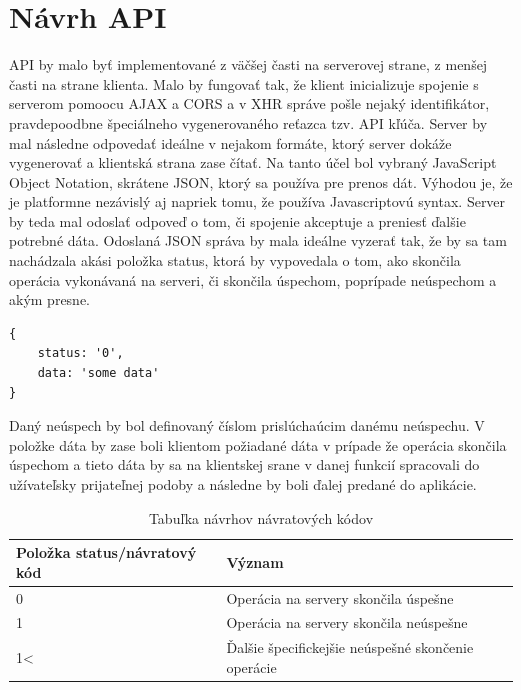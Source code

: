 \section{Návrh API}
API by malo byť implementované z väčšej časti na serverovej strane, z menšej časti na strane klienta. Malo by fungovať tak, že klient inicializuje spojenie s serverom pomoocu AJAX a CORS a v XHR správe pošle nejaký identifikátor, pravdepoodbne špeciálneho vygenerovaného reťazca tzv. API kľúča. Server by mal následne odpovedať ideálne v nejakom formáte, ktorý server dokáže vygenerovať a klientská strana zase čítať. Na tanto účel bol vybraný JavaScript Object Notation, skrátene JSON, ktorý sa používa pre prenos dát. Výhodou je, že je platformne nezávislý aj napriek tomu, že používa Javascriptovú syntax. Server by teda mal odoslať odpoveď o tom, či spojenie akceptuje a preniesť ďalšie potrebné dáta. Odoslaná JSON správa by mala ideálne vyzerať tak, že by sa tam nachádzala akási položka status, ktorá by vypovedala o tom, ako skončila operácia vykonávaná na serveri, či skončila úspechom, poprípade neúspechom a akým presne.  
\begin{lstlisting}[caption=JSON]
{
    status: '0',
    data: 'some data'
}
\end{lstlisting}
Daný neúspech by bol definovaný číslom prislúchaúcim danému neúspechu. V položke dáta by zase boli klientom požiadané dáta v prípade že operácia skončila úspechom a tieto dáta by sa na klientskej srane v danej funkcií spracovali do užívateľsky prijateľnej podoby a následne by boli ďalej predané do aplikácie.
\begin{table}[h]
\centering
\begin{tabular}{|l|l|l|}
\hline
Položka status/návratový kód & Význam \\ \hline
0 & Operácia na servery skončila úspešne \\ \hline
1 & Operácia na servery skončila neúspešne \\ \hline
1\textless & Ďalšie špecifickejšie neúspešné skončenie operácie \\ \hline
\end{tabular}
\label{navratovekody}
\caption{Tabuľka návrhov návratových kódov}
\end{table}

